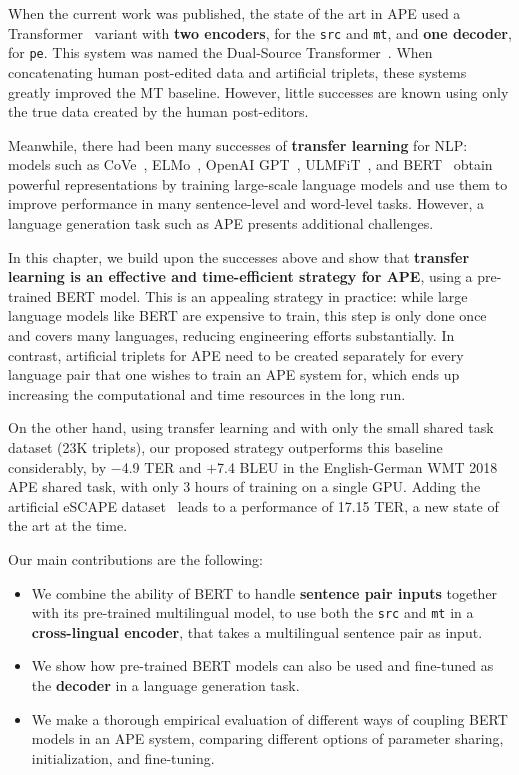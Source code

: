 When the current work was published, the state of the art in APE used
a Transformer~\citep{vaswani2017attention} variant with {\bf two encoders},
for the {\tt src} and {\tt mt}, and {\bf one decoder}, for {\tt pe}.
This system was named the Dual-Source
Transformer~\citep{junczys2018ms, tebbifakhr2018multi}. When
concatenating human post-edited data and artificial triplets, these
systems greatly improved the MT baseline. However, little successes
are known using only the true data created by the human post-editors.

Meanwhile, there had been many successes of {\bf transfer learning}
for NLP: models such as CoVe~\citep{mccann2017learned},
ELMo~\citep{peters2018deep}, OpenAI GPT~\citep{radford2018improving},
ULMFiT~\citep{howard2018universal}, and BERT~\citep{devlin2018bert}
obtain powerful representations by training large-scale language
models and use them to improve performance in many sentence-level and
word-level tasks. However, a language generation task such as APE
presents additional challenges.

In this chapter, we build upon the successes above and show that {\bf
    transfer learning is an effective and time-efficient strategy for
    APE}, using a pre-trained BERT model. This is an appealing strategy
in practice: while large language models like BERT are expensive to
train, this step is only done once and covers many languages,
reducing engineering efforts substantially. In contrast, artificial
triplets for APE need to be created separately for every language
pair that one wishes to train an APE system for, which ends up
increasing the computational and time resources in the long run.

On the other hand, using transfer learning and with only the small shared
task dataset (23K triplets), our proposed strategy outperforms this
baseline considerably, by $-$4.9 TER and $+$7.4 BLEU in the
English-German WMT 2018 APE shared task, with only 3 hours of training on
a single GPU. Adding the artificial eSCAPE
dataset~\citep{negri2018escape} leads to a performance of 17.15 TER,
a new state of the art at the time.

Our main contributions are the following:
\begin{itemize}
  \item We combine the ability of BERT to
        handle {\bf sentence pair inputs} together with its pre-trained
        multilingual model, to use both the {\tt src} and {\tt mt} in a
          {\bf cross-lingual encoder}, that takes a multilingual
        sentence pair as input.
  \item We show how pre-trained BERT models can also be used and
        fine-tuned as the {\bf decoder} in a language generation task.
  \item We make a thorough empirical evaluation of different ways of
        coupling BERT models in an APE system, comparing different options
        of parameter sharing, initialization, and fine-tuning.
\end{itemize}

